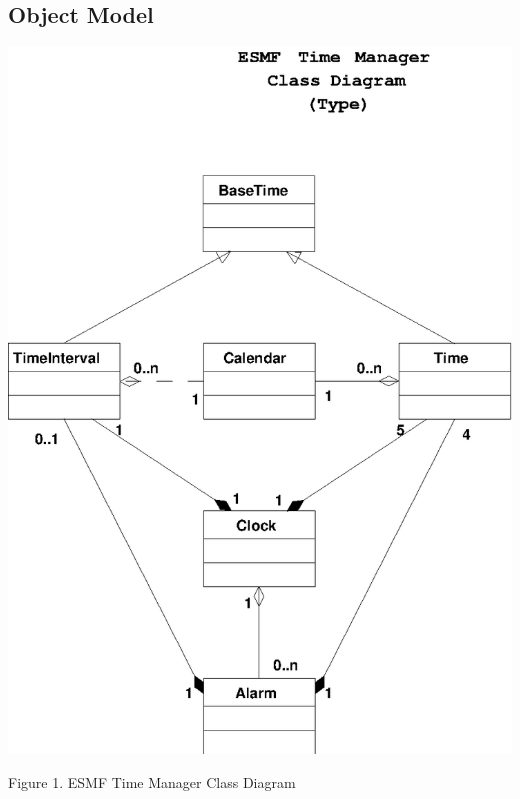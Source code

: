 
\subsection{Object Model}

\begin{center}
\includegraphics{TimeMgrClass.EPS}
   
Figure 1.  ESMF Time Manager Class Diagram
   
\end{center}
